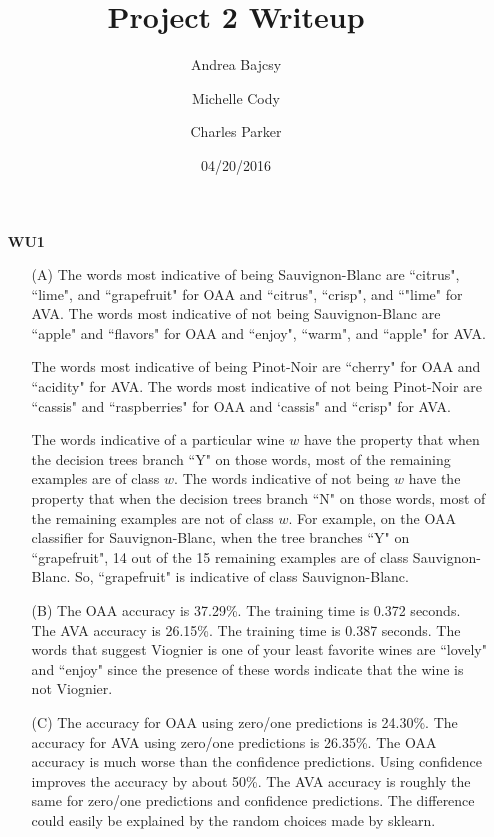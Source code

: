 \documentclass{article}
\title{Project 2 Writeup}
\date{04/20/2016}
\author{Andrea Bajcsy \and Michelle Cody \and Charles Parker }
\begin{document}
	\maketitle
	
	\begin{enumerate}
	
	\item[\textbf{WU1}]
	
	\begin{enumerate}
		\item[(A)] 	 The words most indicative of being Sauvignon-Blanc are ``citrus", ``lime", and ``grapefruit" for OAA and ``citrus", ``crisp", and ``"lime" for AVA. The words most indicative of not being Sauvignon-Blanc are ``apple" and ``flavors" for OAA and ``enjoy", ``warm", and ``apple" for AVA.
		
		The words most indicative of being Pinot-Noir are ``cherry" for OAA and ``acidity" for AVA. The words most indicative of not being Pinot-Noir are ``cassis" and ``raspberries" for OAA and `cassis" and ``crisp" for AVA.
		
		The words indicative of a particular wine $w$ have the property that when the decision trees branch ``Y" on those words, most of the remaining examples are of class $w$. The words indicative of not being $w$ have the property that when the decision trees branch ``N" on those words, most of the remaining examples are not of class $w$. For example, on the OAA classifier for Sauvignon-Blanc, when the tree branches ``Y" on ``grapefruit", 14 out of the 15 remaining examples are of class Sauvignon-Blanc. So, ``grapefruit" is indicative of class Sauvignon-Blanc.
		
		\item[(B)] The OAA accuracy is 37.29\%. The training time is 0.372 seconds.  The AVA accuracy is 26.15\%.  The training time is 0.387 seconds. The words that suggest Viognier is one of your least favorite wines are ``lovely" and ``enjoy" since the presence of these words indicate that the wine is not Viognier.
		
		\item[(C)] The accuracy for OAA using zero/one predictions is 24.30\%. The accuracy for AVA using zero/one predictions is 26.35\%. The OAA accuracy is much worse than the confidence predictions. Using confidence improves the accuracy by about 50\%. The AVA accuracy is roughly the same for zero/one predictions and confidence predictions. The difference could easily be explained by the random choices made by sklearn.
	\end{enumerate}
	


\end{enumerate}
\end{document}
